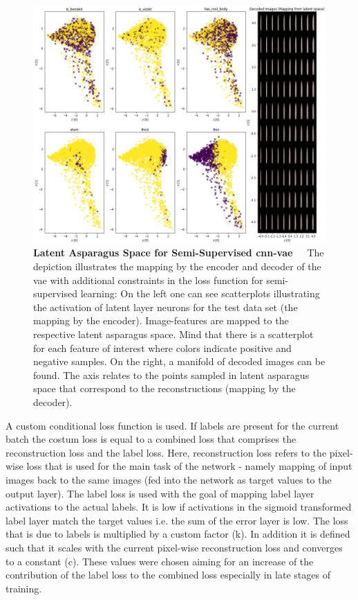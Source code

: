 \begin{figure}[!htb]
	\centering
	\includegraphics[scale=0.35]{Figures/chapter04/semi_supervised_latent_asparagus.png}
	\decoRule
	\caption[Latent Asparagus Space for Semi-Supervised  CNN-VAE]{\textbf{Latent Asparagus Space for Semi-Supervised \acrshort{cnn}-\acrshort{vae}}~~~The depiction illustrates the mapping by the encoder and decoder of the \acrlong{vae} with additional constraints in the loss function for semi-supervised learning: On the left one can see scatterplots illustrating the activation of latent layer neurons for the test data set (the mapping by the encoder). Image-features are mapped to the respective latent asparagus space. Mind that there is a scatterplot for each feature of interest where colors indicate positive and negative samples. On the right, a manifold of decoded images can be found. The axis relates to the points sampled in latent asparagus space that correspond to the reconstructions (mapping by the decoder).}
	\label{fig:SemiSupervisedLatentSpace}
\end{figure}

A custom conditional loss function is used. If labels are present for the current batch the costum loss is equal to a combined loss that comprises the reconstruction loss and the label loss. Here, reconstruction loss refers to the pixel-wise loss that is used for the main task of the network - namely mapping of input images back to the same images (fed into the network as target values to the output layer). The label loss is used with the goal of mapping label layer activations to the actual labels. It is low if activations in the sigmoid transformed label layer match the target values i.e. the sum of the error layer is low. The loss that is due to labels is multiplied by a custom factor (k). In addition it is defined such that it scales with the current pixel-wise reconstruction loss and converges to a constant (c). These values were chosen aiming for an increase of the contribution of the label loss to the combined loss especially in late stages of training.


